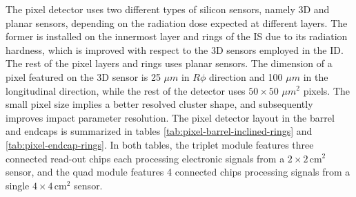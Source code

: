 The pixel detector uses two different types of silicon sensors, namely 3D and planar sensors, depending on the radiation dose expected at different layers. 
The former is installed on the innermost layer and rings of the IS due to its radiation hardness, which is improved with respect to the 3D sensors employed in the ID. 
The rest of the pixel layers and rings uses planar sensors. 
The dimension of a pixel featured on the 3D sensor is 25 $\mu m$ in $R\phi$ direction and 100 $\mu m$ in the longitudinal direction, while the rest of the detector uses $50\times 50$ $\mu m^2$ pixels. 
The small pixel size implies a better resolved cluster shape, and subsequently improves impact parameter resolution. 
The pixel detector layout in the barrel and endcaps is summarized in tables \ref{tab:pixel-barrel-inclined-rings} and \ref{tab:pixel-endcap-rings}. 
In both tables, the triplet module features three connected read-out chips each processing electronic signals from a $2\times 2\, \mathrm{cm}^2$ sensor, and the quad module features 4 connected chips processing signals from a single $4\times4\,\mathrm{cm}^2$ sensor. 

\begin{table}[h]
    \centering
    \caption{Representative parameters of the pixel flat barrel and inclined rings in the ITk layout 03-00-00. Note that while all pixel layers have rings, only the OB features inclined rings. The fifth column provides the number of flat sensors mounted on a complete stave in the central barrel of each layer. The number of inclined rings is given by 2 $\times$ the number of rings on each of the barrel~\cite{Aad_2025}.}
    \label{tab:pixel-barrel-inclined-rings}
\end{table}

